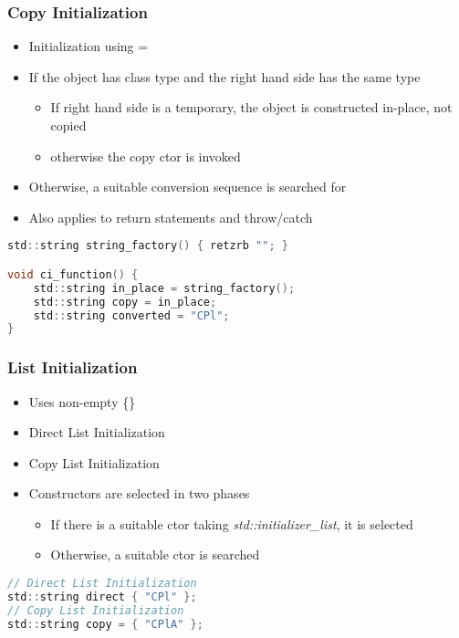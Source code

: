 \subsubsection{Copy Initialization}
\begin{itemize}
    \item Initialization using =
    \item If the object has class type and the right hand side has the same type
    \begin{itemize}
        \item If right hand side is a temporary, the object is constructed in-place, not copied
        \item otherwise the copy ctor is invoked
    \end{itemize}
    \item Otherwise, a suitable conversion sequence is searched for
    \item Also applies to return statements and throw/catch
\end{itemize}

\begin{lstlisting}[style=frame, style= linenumbers, language=C]
std::string string_factory() { retzrb ""; }

void ci_function() {
    std::string in_place = string_factory();
    std::string copy = in_place;
    std::string converted = "CPl";
}
\end{lstlisting}

\subsubsection{List Initialization}
\begin{itemize}
    \item Uses non-empty \{\}
    \item Direct List Initialization
    \item Copy List Initialization
    \item Constructors are selected in two phases
    \begin{itemize}
        \item If there is a suitable ctor taking \textit{std::initializer\_list}, it is selected
        \item Otherwise, a suitable ctor is searched
    \end{itemize}
\end{itemize}

\begin{lstlisting}[style=frame, style= linenumbers, language=C]
// Direct List Initialization
std::string direct { "CPl" };
// Copy List Initialization
std::string copy = { "CPlA" };
\end{lstlisting}

